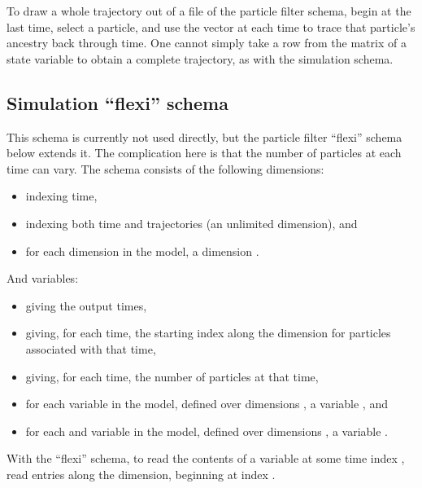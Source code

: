 \begin{tip}
To draw a whole trajectory out of a file of the particle filter schema, begin
at the last time, select a particle, and use the  vector at
each time to trace that particle's ancestry back through time. One cannot
simply take a row from the matrix of a state variable to obtain a complete
trajectory, as with the simulation schema.
\end{tip}

\subsection{Simulation ``flexi'' schema}

This schema is currently not used directly, but the particle filter ``flexi''
schema below extends it. The complication here is that the number of
particles at each time can vary. The schema consists of the following
dimensions:
\begin{itemize}
\item {} indexing time,
\item {} indexing both time and trajectories (an unlimited dimension),
  and
\item for each dimension  in the model, a dimension
  .
\end{itemize}
And variables:
\begin{itemize}
\item {} giving the output times,
\item {} giving, for each time, the starting index along the
   dimension for particles associated with that time,
\item {} giving, for each time, the number of particles at that
  time,
\item for each  variable  in the model,
  defined over dimensions , a variable
  , and
\item for each  and  variable  in the
  model, defined over dimensions , a variable
  .
\end{itemize}

\begin{tip}
With the ``flexi'' schema, to read the contents of a variable at some time
index , read  entries along the 
dimension, beginning at index .
\end{tip}

